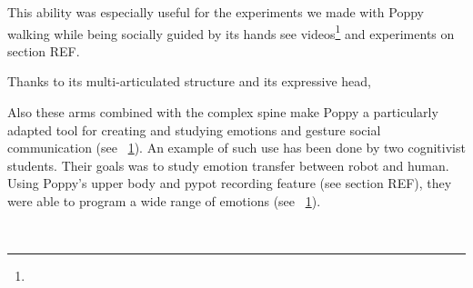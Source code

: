 This ability was especially useful for the experiments we made with Poppy walking while being socially guided by its hands see videos\footnote{} and experiments on section REF.

Thanks to its multi-articulated structure and its expressive head,

Also these arms combined with the complex spine make Poppy a particularly adapted tool for creating and studying emotions and gesture social communication (see \figurename~\ref{fig:TER_cognitic}). An example of such use has been done by two cognitivist students. Their goals was to study emotion transfer between robot and human. Using Poppy's upper body and pypot recording feature (see section REF), they were able to program a wide range of emotions (see \figurename~\ref{fig:TER_cognitic}).


\begin{figure}[tb]
\centering
    \hfil
    \\
    \hfil
    \caption{}
    \label{fig:TER_cognitic}
\end{figure}






